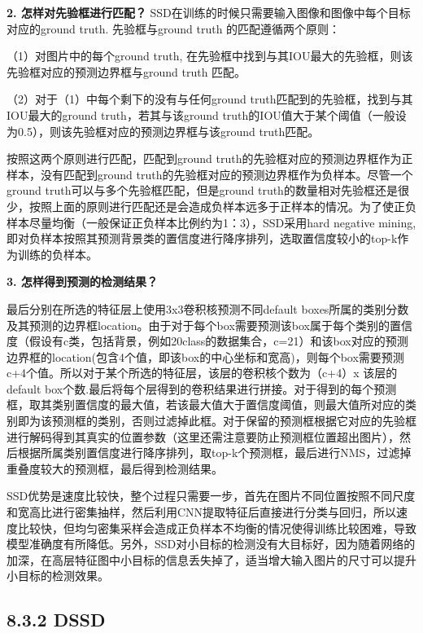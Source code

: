 \begin{figure}
\centering
\caption{}
\end{figure}

\textbf{2. 怎样对先验框进行匹配？}
SSD在训练的时候只需要输入图像和图像中每个目标对应的ground truth.
先验框与ground truth 的匹配遵循两个原则：

（1）对图片中的每个ground truth,
在先验框中找到与其IOU最大的先验框，则该先验框对应的预测边界框与ground
truth 匹配。

（2）对于（1）中每个剩下的没有与任何ground
truth匹配到的先验框，找到与其IOU最大的ground truth，若其与该ground
truth的IOU值大于某个阈值（一般设为0.5），则该先验框对应的预测边界框与该ground
truth匹配。

按照这两个原则进行匹配，匹配到ground
truth的先验框对应的预测边界框作为正样本，没有匹配到ground
truth的先验框对应的预测边界框作为负样本。尽管一个ground
truth可以与多个先验框匹配，但是ground
truth的数量相对先验框还是很少，按照上面的原则进行匹配还是会造成负样本远多于正样本的情况。为了使正负样本尽量均衡（一般保证正负样本比例约为1：3），SSD采用hard
negative mining,
即对负样本按照其预测背景类的置信度进行降序排列，选取置信度较小的top-k作为训练的负样本。

\textbf{3. 怎样得到预测的检测结果？}

最后分别在所选的特征层上使用3x3卷积核预测不同default
boxes所属的类别分数及其预测的边界框location。由于对于每个box需要预测该box属于每个类别的置信度（假设有c类，包括背景，例如20class的数据集合，c=21）和该box对应的预测边界框的location(包含4个值，即该box的中心坐标和宽高)，则每个box需要预测c+4个值。所以对于某个所选的特征层，该层的卷积核个数为（c+4）x
该层的default
box个数.最后将每个层得到的卷积结果进行拼接。对于得到的每个预测框，取其类别置信度的最大值，若该最大值大于置信度阈值，则最大值所对应的类别即为该预测框的类别，否则过滤掉此框。对于保留的预测框根据它对应的先验框进行解码得到其真实的位置参数（这里还需注意要防止预测框位置超出图片），然后根据所属类别置信度进行降序排列，取top-k个预测框，最后进行NMS，过滤掉重叠度较大的预测框，最后得到检测结果。

SSD优势是速度比较快，整个过程只需要一步，首先在图片不同位置按照不同尺度和宽高比进行密集抽样，然后利用CNN提取特征后直接进行分类与回归，所以速度比较快，但均匀密集采样会造成正负样本不均衡的情况使得训练比较困难，导致模型准确度有所降低。另外，SSD对小目标的检测没有大目标好，因为随着网络的加深，在高层特征图中小目标的信息丢失掉了，适当增大输入图片的尺寸可以提升小目标的检测效果。

\subsection{8.3.2 DSSD}\label{dssd}

